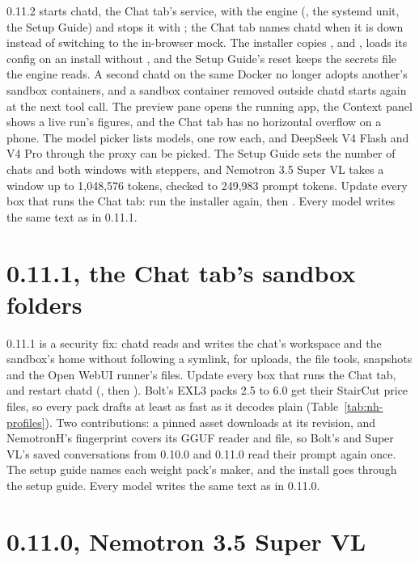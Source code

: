 0.11.2 starts chatd, the Chat tab's service, with the engine (, the systemd unit, the Setup Guide) and stops it with ; the Chat tab names chatd when it is down instead of switching to the in-browser mock. The installer copies ,  and ,  loads its config on an install without , and the Setup Guide's reset keeps the secrets file the engine reads. A second chatd on the same Docker no longer adopts another's sandbox containers, and a sandbox container removed outside chatd starts again at the next tool call. The preview pane opens the running app, the Context panel shows a live run's figures, and the Chat tab has no horizontal overflow on a phone. The model picker lists models, one row each, and DeepSeek V4 Flash and V4 Pro through the proxy can be picked. The Setup Guide sets the number of chats and both windows with steppers, and Nemotron 3.5 Super VL takes a window up to 1,048,576 tokens, checked to 249,983 prompt tokens. Update every box that runs the Chat tab: run the installer again, then . Every model writes the same text as in 0.11.1.

\section{0.11.1, the Chat tab's sandbox folders}\label{sec:changelog-0111}

0.11.1 is a security fix: chatd reads and writes the chat's workspace and the sandbox's home without following a symlink, for uploads, the file tools, snapshots and the Open WebUI runner's files. Update every box that runs the Chat tab, and restart chatd (, then ). Bolt's EXL3 packs 2.5 to 6.0 get their StairCut price files, so every pack drafts at least as fast as it decodes plain (Table~\ref{tab:nh-profiles}). Two contributions: a pinned asset downloads at its revision, and NemotronH's fingerprint covers its GGUF reader and file, so Bolt's and Super VL's saved conversations from 0.10.0 and 0.11.0 read their prompt again once. The setup guide names each weight pack's maker, and the install goes through the setup guide. Every model writes the same text as in 0.11.0.

\section{0.11.0, Nemotron 3.5 Super VL}\label{sec:changelog-0110}

